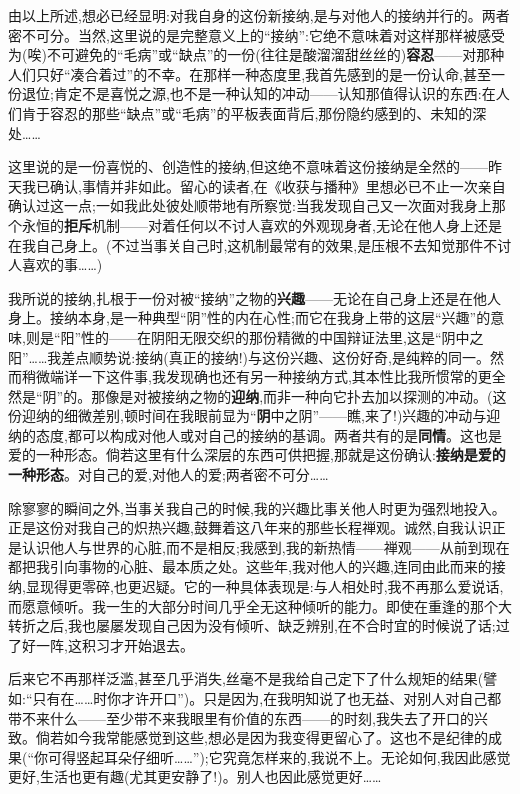 由以上所述,想必已经显明:对我自身的这份新接纳,是与对他人的接纳并行的。两者密不可分。当然,这里说的是完整意义上的“接纳”:它绝不意味着对这样那样被感受为(唉)不可避免的“毛病”或“缺点”的一份(往往是酸溜溜甜丝丝的)\textbf{容忍}——对那种人们只好“凑合着过”的不幸。在那样一种态度里,我首先感到的是一份认命,甚至一份退位;肯定不是喜悦之源,也不是一种认知的冲动——认知那值得认识的东西:在人们肯于容忍的那些“缺点”或“毛病”的平板表面背后,那份隐约感到的、未知的深处……

这里说的是一份喜悦的、创造性的接纳,但这绝不意味着这份接纳是全然的——昨天我已确认,事情并非如此。留心的读者,在《收获与播种》里想必已不止一次亲自确认过这一点;一如我此处彼处顺带地有所察觉:当我发现自己又一次面对我身上那个永恒的\textbf{拒斥}机制——对着任何以不讨人喜欢的外观现身者,无论在他人身上还是在我自己身上\dmark{}。(不过当事关自己时,这机制最常有的效果,是压根不去知觉那件不讨人喜欢的事……)

我所说的接纳,扎根于一份对被“接纳”之物的\textbf{兴趣}——无论在自己身上还是在他人身上。接纳本身,是一种典型“阴”性的内在心性;而它在我身上带的这层“兴趣”的意味,则是“阳”性的——在阴阳无限交织的那份精微的中国辩证法里,这是“阴中之阳”……我差点顺势说:接纳(真正的接纳!)与这份兴趣、这份好奇,是纯粹的同一。然而稍微端详一下这件事,我发现确也还有另一种接纳方式,其本性比我所惯常的更全然是“阴”的。那像是对被接纳之物的\textbf{迎纳},而非一种向它扑去加以探测的冲动。(这份迎纳的细微差别,顿时间在我眼前显为“\textbf{阴}中之阴”——瞧,来了!)兴趣的冲动与迎纳的态度,都可以构成对他人或对自己的接纳的基调。两者共有的是\textbf{同情}。这也是爱的一种形态。倘若这里有什么深层的东西可供把握,那就是这份确认:\textbf{接纳是爱的一种形态}。对自己的爱,对他人的爱;两者密不可分……

除寥寥的瞬间之外,当事关我自己的时候,我的兴趣比事关他人时更为强烈地投入。正是这份对我自己的炽热兴趣,鼓舞着这八年来的那些长程禅观。诚然,自我认识正是认识他人与世界的心脏,而不是相反;我感到,我的新热情——禅观——从前到现在都把我引向事物的心脏、最本质之处。这些年,我对他人的兴趣,连同由此而来的接纳,显现得更零碎,也更迟疑。它的一种具体表现是:与人相处时,我不再那么爱说话,而愿意倾听。我一生的大部分时间几乎全无这种倾听的能力。即使在重逢的那个大转折之后,我也屡屡发现自己因为没有倾听、缺乏辨别,\dmark{}在不合时宜的时候说了话;过了好一阵,这积习才开始退去。

后来它不再那样泛滥,甚至几乎消失,丝毫不是我给自己定下了什么规矩的结果(譬如:“只有在……时你才许开口”)。只是因为,在我明知说了也无益、对别人对自己都带不来什么——至少带不来我眼里有价值的东西——的时刻,我失去了开口的兴致。倘若如今我常能感觉到这些,想必是因为我变得更留心了。这也不是纪律的成果(“你可得竖起耳朵仔细听……”);它究竟怎样来的,我说不上。无论如何,我因此感觉更好,生活也更有趣(尤其更安静了!)。别人也因此感觉更好……

